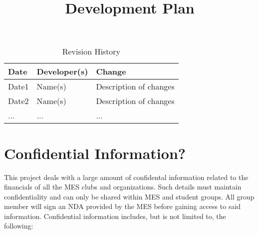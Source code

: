 \documentclass{article}
\title{Development Plan\\\progname}
\author{\authname}
\date{}
\begin{document}
\maketitle

\begin{table}[hp]
\caption{Revision History} \label{TblRevisionHistory}
\begin{tabularx}{\textwidth}{llX}
\toprule
\textbf{Date} & \textbf{Developer(s)} & \textbf{Change}\\
\midrule
Date1 & Name(s) & Description of changes\\
Date2 & Name(s) & Description of changes\\
... & ... & ...\\
\bottomrule
\end{tabularx}
\end{table}

\newpage{}



\section{Confidential Information?}
This project deals with a large amount of confidental information related to the financials of all the MES clubs and organizations. Such details must maintain confidentiality and can only be shared within MES and student groups. All group member will sign an NDA provided by the MES before gaining access to said information. Confidential information includes, but is not limited to, the following:
\end{document}
